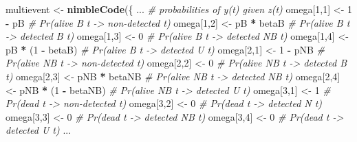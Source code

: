 \documentclass[
  12pt,
]{krantz}
\newenvironment{Shaded}{\begin{snugshade}}{\end{snugshade}}
\newcommand{\CommentTok}[1]{\textcolor[rgb]{0.56,0.35,0.01}{\textit{#1}}}
\newcommand{\DecValTok}[1]{\textcolor[rgb]{0.00,0.00,0.81}{#1}}
\newcommand{\FunctionTok}[1]{\textcolor[rgb]{0.13,0.29,0.53}{\textbf{#1}}}
\newcommand{\NormalTok}[1]{#1}
\newcommand{\OtherTok}[1]{\textcolor[rgb]{0.56,0.35,0.01}{#1}}
\newcommand{\SpecialCharTok}[1]{\textcolor[rgb]{0.81,0.36,0.00}{\textbf{#1}}}
\begin{document}
\begin{Shaded}
\begin{Highlighting}[]
\NormalTok{multievent }\OtherTok{\textless{}{-}} \FunctionTok{nimbleCode}\NormalTok{(\{}
\NormalTok{...}
  \CommentTok{\# probabilities of y(t) given z(t)}
\NormalTok{  omega[}\DecValTok{1}\NormalTok{,}\DecValTok{1}\NormalTok{] }\OtherTok{\textless{}{-}} \DecValTok{1} \SpecialCharTok{{-}}\NormalTok{ pB             }\CommentTok{\# Pr(alive B t {-}\textgreater{} non{-}detected t)}
\NormalTok{  omega[}\DecValTok{1}\NormalTok{,}\DecValTok{2}\NormalTok{] }\OtherTok{\textless{}{-}}\NormalTok{ pB }\SpecialCharTok{*}\NormalTok{ betaB         }\CommentTok{\# Pr(alive B t {-}\textgreater{} detected B t)}
\NormalTok{  omega[}\DecValTok{1}\NormalTok{,}\DecValTok{3}\NormalTok{] }\OtherTok{\textless{}{-}} \DecValTok{0}                  \CommentTok{\# Pr(alive B t {-}\textgreater{} detected NB t)}
\NormalTok{  omega[}\DecValTok{1}\NormalTok{,}\DecValTok{4}\NormalTok{] }\OtherTok{\textless{}{-}}\NormalTok{ pB }\SpecialCharTok{*}\NormalTok{ (}\DecValTok{1} \SpecialCharTok{{-}}\NormalTok{ betaB)   }\CommentTok{\# Pr(alive B t {-}\textgreater{} detected U t)}
\NormalTok{  omega[}\DecValTok{2}\NormalTok{,}\DecValTok{1}\NormalTok{] }\OtherTok{\textless{}{-}} \DecValTok{1} \SpecialCharTok{{-}}\NormalTok{ pNB            }\CommentTok{\# Pr(alive NB t {-}\textgreater{} non{-}detected t)}
\NormalTok{  omega[}\DecValTok{2}\NormalTok{,}\DecValTok{2}\NormalTok{] }\OtherTok{\textless{}{-}} \DecValTok{0}                  \CommentTok{\# Pr(alive NB t {-}\textgreater{} detected B t)}
\NormalTok{  omega[}\DecValTok{2}\NormalTok{,}\DecValTok{3}\NormalTok{] }\OtherTok{\textless{}{-}}\NormalTok{ pNB }\SpecialCharTok{*}\NormalTok{ betaNB       }\CommentTok{\# Pr(alive NB t {-}\textgreater{} detected NB t)}
\NormalTok{  omega[}\DecValTok{2}\NormalTok{,}\DecValTok{4}\NormalTok{] }\OtherTok{\textless{}{-}}\NormalTok{ pNB }\SpecialCharTok{*}\NormalTok{ (}\DecValTok{1} \SpecialCharTok{{-}}\NormalTok{ betaNB) }\CommentTok{\# Pr(alive NB t {-}\textgreater{} detected U t)}
\NormalTok{  omega[}\DecValTok{3}\NormalTok{,}\DecValTok{1}\NormalTok{] }\OtherTok{\textless{}{-}} \DecValTok{1}                  \CommentTok{\# Pr(dead t {-}\textgreater{} non{-}detected t)}
\NormalTok{  omega[}\DecValTok{3}\NormalTok{,}\DecValTok{2}\NormalTok{] }\OtherTok{\textless{}{-}} \DecValTok{0}                  \CommentTok{\# Pr(dead t {-}\textgreater{} detected N t)}
\NormalTok{  omega[}\DecValTok{3}\NormalTok{,}\DecValTok{3}\NormalTok{] }\OtherTok{\textless{}{-}} \DecValTok{0}                  \CommentTok{\# Pr(dead t {-}\textgreater{} detected NB t)}
\NormalTok{  omega[}\DecValTok{3}\NormalTok{,}\DecValTok{4}\NormalTok{] }\OtherTok{\textless{}{-}} \DecValTok{0}                  \CommentTok{\# Pr(dead t {-}\textgreater{} detected U t)}
\NormalTok{...}
\end{Highlighting}
\end{Shaded}
\end{document}
